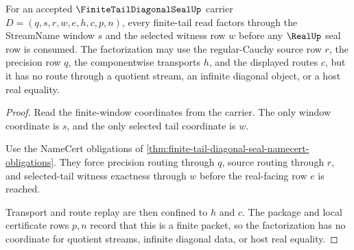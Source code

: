 \begin{theorem}
\label{thm:finite-tail-diagonal-seal-window-factorization}
For an accepted $\FiniteTailDiagonalSealUp$ carrier $D=(q,s,r,w,e,h,c,p,n)$, every finite-tail read factors through the StreamName window $s$ and the selected witness row $w$ before any $\RealUp$ seal row is consumed. The factorization may use the regular-Cauchy source row $r$, the precision row $q$, the componentwise transports $h$, and the displayed routes $c$, but it has no route through a quotient stream, an infinite diagonal object, or a host real equality.
\end{theorem}
\begin{proof}
Read the finite-window coordinates from the carrier. The only window coordinate is $s$, and the only selected tail coordinate is $w$.

Use the NameCert obligations of \autoref{thm:finite-tail-diagonal-seal-namecert-obligations}. They force precision routing through $q$, source routing through $r$, and selected-tail witness exactness through $w$ before the real-facing row $e$ is reached.

Transport and route replay are then confined to $h$ and $c$. The package and local certificate rows $p,n$ record that this is a finite packet, so the factorization has no coordinate for quotient streams, infinite diagonal data, or host real equality.
\end{proof}

